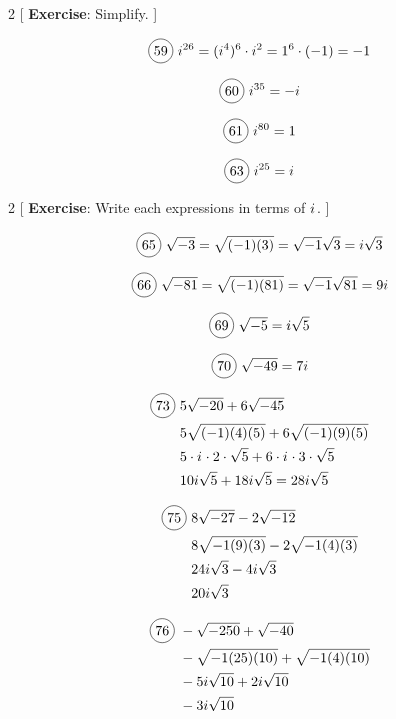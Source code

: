 
\begin{multicols}{2}
[
  \textbf{Exercise}: Simplify.
]

\begin{align*}
  \circled{59}\ i^{26}=(i^{4})^{6}\cdot i^{2}=1^{6}\cdot(-1)=-1
\end{align*}

  \[\circled{60}\ i^{35}=-i\]

  \[\circled{61}\ i^{80}=1\]

  \[\circled{63}\ i^{25}=\iu\]
\end{multicols}

\vspace{.5cm}

\begin{multicols}{2}
[
  \textbf{Exercise}: Write each expressions in terms of ${i\mkern1mu}$.
]

\begin{align*}
  \circled{65}\ \sqrt{-3}=\sqrt{(-1)(3)}=\sqrt{-1}\sqrt{3}=i\sqrt{3}
\end{align*}

\begin{align*}
  \circled{66}\ \sqrt{-81}=\sqrt{(-1)(81)}=\sqrt{-1}\sqrt{81}=9i
\end{align*}

  \[\circled{69}\ \sqrt{-5}=i\sqrt{5}\]

  \[\circled{70}\ \sqrt{-49}=7i\]

\begin{align*}
  \circled{73}\ &5\sqrt{-20}+6\sqrt{-45}\\
  &5\sqrt{(-1)(4)(5)}+6\sqrt{(-1)(9)(5)}\\
  &5\cdot \iu \cdot 2 \cdot \sqrt{5}+6\cdot \iu \cdot 3 \cdot \sqrt{5}\\
  &10i\sqrt{5}+18i\sqrt{5}=28i\sqrt{5}
\end{align*}

\begin{align*}
  \circled{75}\ &8\sqrt{-27}-2\sqrt{-12}\\
  &8\sqrt{-1(9)(3)}-2\sqrt{-1(4)(3)}\\
  &24i\sqrt{3}-4i\sqrt{3}\\
  &20i\sqrt{3}
\end{align*}

\begin{align*}
  \circled{76}\ &-\sqrt{-250}+\sqrt{-40}\\
  &-\sqrt{-1(25)(10)}+\sqrt{-1(4)(10)}\\
  &-5i\sqrt{10}+2i\sqrt{10}\\
  &-3i\sqrt{10}
\end{align*}

\end{multicols}

